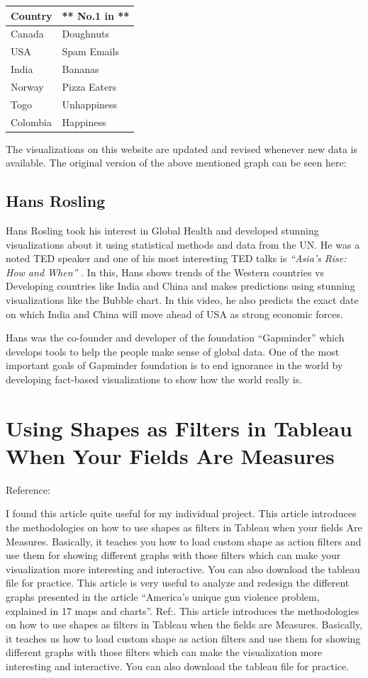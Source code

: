 \documentclass[]{book}
\theoremstyle{definition}
\theoremstyle{definition}
\theoremstyle{definition}
\theoremstyle{remark}
\begin{document}
\begin{longtable}[]{@{}ll@{}}
\toprule
\textbf{Country } & ** No.1 in **\tabularnewline
\midrule
\endhead
Canada & Doughnuts\tabularnewline
USA & Spam Emails\tabularnewline
India & Bananas\tabularnewline
Norway & Pizza Eaters\tabularnewline
Togo & Unhappiness\tabularnewline
Colombia & Happiness\tabularnewline
\bottomrule
\end{longtable}

The visualizations on this website are updated and revised whenever new
data is available. The original version of the above mentioned graph can
be seen here: \citep{country_original}

\subsection{Hans Rosling}\label{hans-rosling}

Hans Rosling took his interest in Global Health and developed stunning
visualizations about it using statistical methods and data from the UN.
He was a noted TED speaker and one of his most interesting TED talks is
\emph{``Asia's Rise: How and When''} \citep{hans}. In this, Hans shows
trends of the Western countries vs Developing countries like India and
China and makes predictions using stunning visualizations like the
Bubble chart. In this video, he also predicts the exact date on which
India and China will move ahead of USA as strong economic forces.

Hans was the co-founder and developer of the foundation
``Gapminder''\citep{gapminder} which develops tools to help the people
make sense of global data. One of the most important goals of Gapminder
foundation is to end ignorance in the world by developing fact-based
visualizations to show how the world really is.

\section{Using Shapes as Filters in Tableau When Your Fields Are
Measures}\label{using-shapes-as-filters-in-tableau-when-your-fields-are-measures}

Reference: \citep{interworks}

I found this article quite useful for my individual project. This
article introduces the methodologies on how to use shapes as filters in
Tableau when your fields Are Measures. Basically, it teaches you how to
load custom shape as action filters and use them for showing different
graphs with those filters which can make your visualization more
interesting and interactive. You can also download the tableau file for
practice. This article is very useful to analyze and redesign the
different graphs presented in the article ``America's unique gun
violence problem, explained in 17 maps and charts''.
Ref:\citep{gunviolence}. This article introduces the methodologies on
how to use shapes as filters in Tableau when the fields are Measures.
Basically, it teaches us how to load custom shape as action filters and
use them for showing different graphs with those filters which can make
the visualization more interesting and interactive. You can also
download the tableau file for practice.
\end{document}
